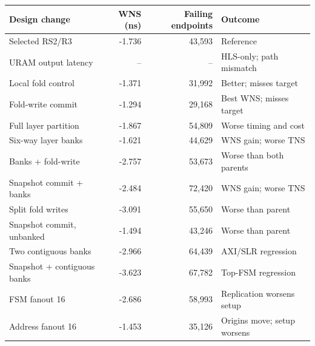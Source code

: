 \begin{tabular}{lrrl}
\toprule
Design change & WNS (ns) & Failing endpoints & Outcome \\
\midrule
Selected RS2/R3 & -1.736 & 43{,}593 & Reference \\
URAM output latency & -- & -- & HLS-only; path mismatch \\
Local fold control & -1.371 & 31{,}992 & Better; misses target \\
Fold-write commit & -1.294 & 29{,}168 & Best WNS; misses target \\
Full layer partition & -1.867 & 54{,}809 & Worse timing and cost \\
Six-way layer banks & -1.621 & 44{,}629 & WNS gain; worse TNS \\
Banks + fold-write & -2.757 & 53{,}673 & Worse than both parents \\
Snapshot commit + banks & -2.484 & 72{,}420 & WNS gain; worse TNS \\
Split fold writes & -3.091 & 55{,}650 & Worse than parent \\
Snapshot commit, unbanked & -1.494 & 43{,}246 & Worse than parent \\
Two contiguous banks & -2.966 & 64{,}439 & AXI/SLR regression \\
Snapshot + contiguous banks & -3.623 & 67{,}782 & Top-FSM regression \\
FSM fanout 16 & -2.686 & 58{,}993 & Replication worsens setup \\
Address fanout 16 & -1.453 & 35{,}126 & Origins move; setup worsens \\
\bottomrule
\end{tabular}
